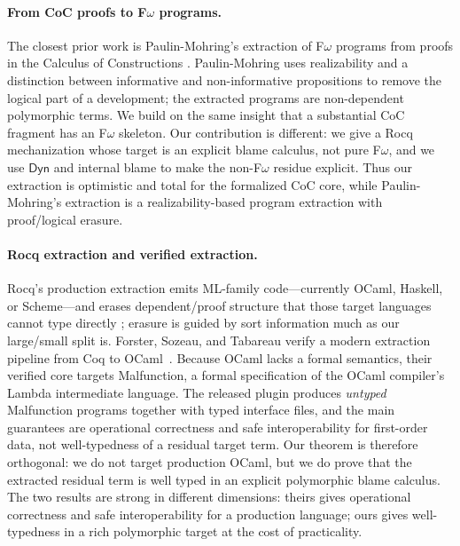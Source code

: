 \documentclass[acmsmall,anonymous=false,nonacm]{acmart}
\newcommand{\dyn}{\ensuremath{\mathsf{Dyn}}}
\begin{document}
\paragraph{From CoC proofs to F$\omega$ programs.}
The closest prior work is Paulin-Mohring's extraction of
F$\omega$ programs from proofs in the Calculus of Constructions
\cite{paulinmohring1989fomega}.  Paulin-Mohring uses realizability and a
distinction between informative and non-informative propositions to remove the
logical part of a development; the extracted programs are non-dependent
polymorphic terms.  We build on the same insight that a substantial CoC
fragment has an F$\omega$ skeleton.  Our contribution is different: we give a
Rocq mechanization whose target is an explicit blame calculus, not pure
F$\omega$, and we use $\dyn$ and internal blame to make the non-F$\omega$
residue explicit.  Thus our extraction is optimistic and total for the
formalized CoC core, while Paulin-Mohring's extraction is a realizability-based
program extraction with proof/logical erasure.

\paragraph{Rocq extraction and verified extraction.}
Rocq's production extraction emits ML-family code---currently OCaml, Haskell, or
Scheme---and erases dependent/proof structure that those target languages cannot
type directly \cite{letouzey2003extraction,letouzey2004these}; erasure is guided
by sort information much as our large/small split is.  Forster, Sozeau, and
Tabareau verify a modern extraction pipeline from Coq to
OCaml~\cite{forster2024verified}.  Because OCaml lacks a formal semantics, their
verified core targets Malfunction, a formal specification of the OCaml
compiler's Lambda intermediate language.  The released plugin produces
\emph{untyped} Malfunction programs together with typed interface files, and the
main guarantees are operational correctness and safe interoperability for
first-order data, not well-typedness of a residual target term.  Our theorem is
therefore orthogonal: we do not target production OCaml, but we do prove that
the extracted residual term is well typed in an explicit polymorphic blame
calculus.  The two results are strong in different dimensions: theirs gives
operational correctness and safe interoperability for a production language;
ours gives well-typedness in a rich polymorphic target at the cost of
practicality.
\end{document}
